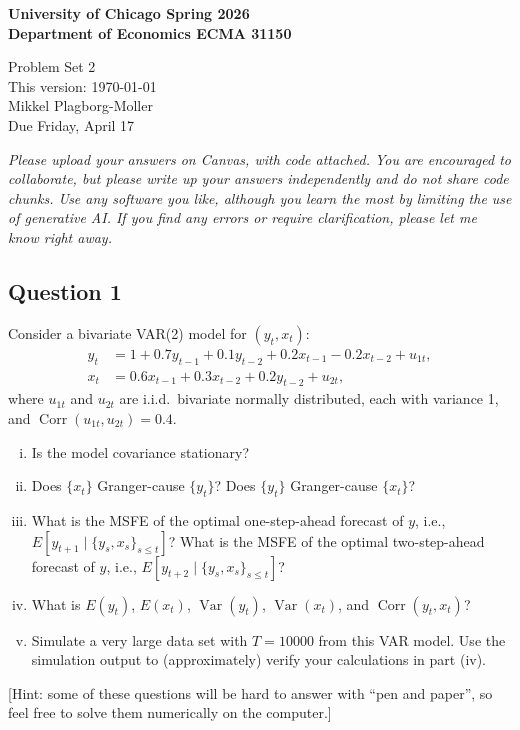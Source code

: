 \documentclass[12pt]{article}
\theoremstyle{plain}
\DeclareMathOperator*{\var}{Var}
\DeclareMathOperator*{\corr}{Corr}
\begin{document}
{\noindent \bf University of Chicago \hfill
Spring 2026 \\
Department of Economics \hfill ECMA 31150}

\begin{center}
{\Large Problem Set 2} \\
This version: \today \\[1ex]
Mikkel Plagborg-Moller \\
\vspace{0.5\baselineskip}
Due Friday, April 17
\end{center}
\vspace{0.2\baselineskip}

\noindent \emph{Please upload your answers on Canvas, with code attached. You are encouraged to collaborate, but please write up your answers independently and do not share code chunks. Use any software you like, although you learn the most by limiting the use of generative AI. If you find any errors or require clarification, please let me know right away.}

\subsection*{Question 1}
Consider a bivariate VAR(2) model for $(y_t,x_t)$:
\begin{align*}
y_t &= 1 + 0.7 y_{t-1} + 0.1 y_{t-2} + 0.2 x_{t-1} - 0.2x_{t-2} + u_{1t}, \\
x_t &= 0.6 x_{t-1} + 0.3 x_{t-2} + 0.2 y_{t-2} + u_{2t},
\end{align*}
where $u_{1t}$ and $u_{2t}$ are i.i.d.\ bivariate normally distributed, each with variance 1, and $\corr(u_{1t},u_{2t})=0.4$.
\begin{enumerate}[i)]
\item Is the model covariance stationary?
\item Does $\lbrace x_t \rbrace$ Granger-cause $\lbrace y_t \rbrace$? Does $\lbrace y_t \rbrace$ Granger-cause $\lbrace x_t \rbrace$?
\item What is the MSFE of the optimal one-step-ahead forecast of $y$, i.e., $E[y_{t+1} \mid \lbrace y_s,x_s \rbrace_{s \leq t}]$? What is the MSFE of the optimal two-step-ahead forecast of $y$, i.e., $E[y_{t+2} \mid \lbrace y_s,x_s \rbrace_{s \leq t}]$?
\item What is $E(y_t)$, $E(x_t)$, $\var(y_t)$, $\var(x_t)$, and $\corr(y_t,x_t)$?
\item Simulate a very large data set with $T=10000$ from this VAR model. Use the simulation output to (approximately) verify your calculations in part (iv).
\end{enumerate}
[Hint: some of these questions will be hard to answer with ``pen and paper'', so feel free to solve them numerically on the computer.]
\end{document}
